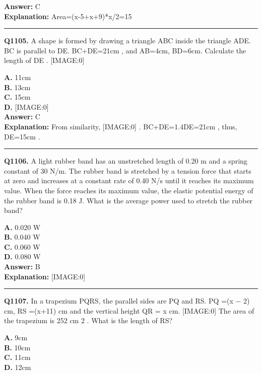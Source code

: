 \documentclass[12pt]{article}
\begin{document}
\textbf{Answer:} C \\
\textbf{Explanation:} Area=(x-5+x+9)*x/2=15

\hrule
\vspace{1em}


\noindent
\textbf{Q1105.} A shape is formed by drawing a triangle ABC inside the triangle ADE. BC is parallel to DE. BC+DE=21cm
, and AB=4cm, BD=6cm.
Calculate the length of DE
.
[IMAGE:0]



\textbf{A.} 11cm \\
\textbf{B.} 13cm \\
\textbf{C.} 15cm \\
\textbf{D.} [IMAGE:0] \\

\textbf{Answer:} C \\
\textbf{Explanation:} From similarity,
[IMAGE:0]
. BC+DE=1.4DE=21cm
, thus, DE=15cm
.

\hrule
\vspace{1em}


\noindent
\textbf{Q1106.} A light rubber band has an unstretched length of 0.20 m and a spring constant of 30 N/m. The rubber band is stretched by a tension force that starts at zero and increases at a constant rate of 0.40 N/s until it reaches its maximum value. When the force reaches its maximum value, the elastic potential energy of the rubber band is 0.18 J. What is the average power used to stretch the rubber band?



\textbf{A.} 0.020 W \\
\textbf{B.} 0.040 W \\
\textbf{C.} 0.060 W \\
\textbf{D.} 0.080 W \\

\textbf{Answer:} B \\
\textbf{Explanation:} [IMAGE:0]

\hrule
\vspace{1em}


\noindent
\textbf{Q1107.} In a trapezium PQRS, the parallel sides are PQ and RS. PQ =(x
−
2) cm, RS =(x+11) cm and the vertical height QR = x cm.
[IMAGE:0]
The area of the trapezium is 252 cm
2
. What is the length of RS?



\textbf{A.} 9cm \\
\textbf{B.} 10cm \\
\textbf{C.} 11cm \\
\textbf{D.} 12cm \\
\end{document}
